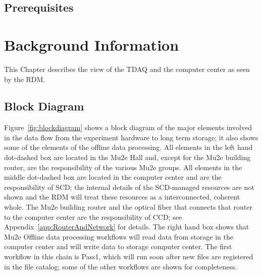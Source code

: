\section{Prerequisites}


\chapter{Background Information}
\label{chap:BackgroundInfo}
This Chapter describes the view of the TDAQ and the computer center as seen by the RDM.

\section{Block Diagram}
\label{sec:BlockDiagram}

Figure~\ref{fig:blockdiagram} shows a block diagram of the major elements involved
in the data flow from the experiment hardware to long term storage; it also shows
some of the elements of the offline data processing.
All elements in the left hand dot-dashed box are located in the Mu2e Hall
and, except for the Mu2e building router, are the responsibility of the various Mu2e groups.
All elements in the middle dot-dashed box are located in the computer center
and are the responsibility of SCD; the internal details of the SCD-managed resources
are not shown and the RDM will treat these resources as a interconnected, coherent whole.
The Mu2e building router and the optical fiber that connects that router
to the computer center are the responsibility of CCD;
see Appendix~\ref{app:RouterAndNetwork} for details.
The right hand box shows that Mu2e Offline data processing workflows
will read data from storage in the computer center
and will write data to storage computer center.
The first workflow in this chain is Pass1, which will run soon after new files
are registered in the file catalog;
some of the other workflows are shown for completeness.

